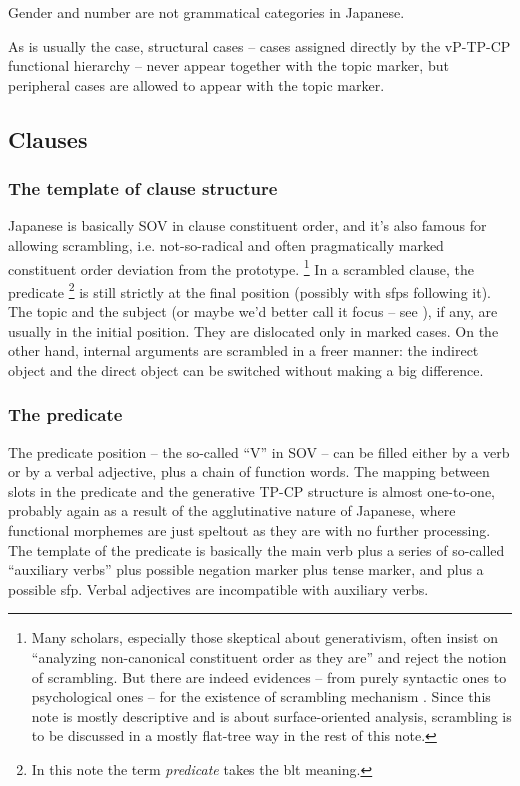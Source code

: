 \documentclass[UTF8, a4paper, oneside, scheme=plain]{ctexart}
\newcommand*{\term}[1]{\emph{#1}}
\begin{document}
Gender and number are not grammatical categories in Japanese.



As is usually the case,
structural cases -- cases assigned directly by the vP-TP-CP functional hierarchy 
-- never appear together with the topic marker,
but peripheral cases are allowed to appear with the topic marker.

\subsection{Clauses}

\subsubsection{The template of clause structure}

Japanese is basically SOV in clause constituent order,
and it's also famous for allowing scrambling,
i.e. not-so-radical and often pragmatically marked constituent order deviation from the prototype.%
\footnote{
    Many scholars, especially those skeptical about generativism,
    often insist on ``analyzing non-canonical constituent order as they are''
    and reject the notion of scrambling.
    But there are indeed evidences -- from purely syntactic ones to psychological ones -- 
    for the existence of scrambling mechanism \citep{imamura2015effects,imamura2016processing,yatsushiro2003vp}.
    Since this note is mostly descriptive and is about surface-oriented analysis,
    scrambling is to be discussed in a mostly flat-tree way in the rest of this note.
}
In a scrambled clause, 
the predicate%
\footnote{
    In this note the term \term{predicate} takes the \ac{blt} meaning.
}
is still strictly at the final position 
(possibly with \acs{sfp}s following it).
The topic and the subject (or maybe we'd better call it focus -- see ), 
if any, are usually in the initial position.
They are dislocated only in marked cases.
On the other hand, 
internal arguments are scrambled in a freer manner:
the indirect object and the direct object can be switched without making a big difference.

\subsubsection{The predicate}

The predicate position -- the so-called ``V'' in SOV -- 
can be filled either by a verb or by a verbal adjective,
plus a chain of function words.
The mapping between slots in the predicate and the generative TP-CP structure is almost one-to-one,
probably again as a result of the agglutinative nature of Japanese,
where functional morphemes are just speltout as they are with no further processing.
The template of the predicate is basically
the main verb plus a series of so-called ``auxiliary verbs'' 
plus possible negation marker plus tense marker,
and plus a possible \ac{sfp}. 
Verbal adjectives are incompatible with auxiliary verbs.
\end{document}
